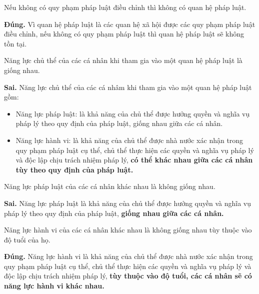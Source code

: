\begin{ques}
Nếu không có quy phạm pháp luật điều chỉnh thì không có quan hệ pháp luật.
\end{ques}
\begin{ans}
\textbf{Đúng.} Vì quan hệ pháp luật là các quan hệ xã hội được các quy phạm pháp luật điều chỉnh, nếu không có quy phạm pháp luật thì quan hệ pháp luật sẽ không tồn tại.
\end{ans}

\begin{ques}
Năng lực chủ thể của các cá nhân khi tham gia vào một quan hệ pháp luật là giống nhau.
\end{ques}
\begin{ans}
\textbf{Sai.} Năng lực chủ thể của các cá nhâm khi tham gia vào một quan hệ pháp luật gồm:
\begin{itemize}
\item Năng lực pháp luật: là khả năng của chủ thể được hưởng quyền và nghĩa vụ pháp lý theo quy định của pháp luật, giống nhau giữa các cá nhân.
\item Năng lực hành vi: là khả năng của chủ thể được nhà nước xác nhận trong quy phạm pháp luật cụ thể, chủ thể thực hiện các quyền và nghĩa vụ pháp lý và độc lập chịu trách nhiệm pháp lý, \textbf{có thể khác nhau giữa các cá nhân tùy theo quy định của pháp luật.}
\end{itemize}
\end{ans}

\begin{ques}
Năng lực pháp luật của các cá nhân khác nhau là không giống nhau.
\end{ques}
\begin{ans}
\textbf{Sai.} Năng lực pháp luật là khả năng của chủ thể được hưởng quyền và nghĩa vụ pháp lý theo quy định của pháp luật, \textbf{giống nhau giữa các cá nhân.}
\end{ans}

\begin{ques}
Năng lực hành vi của các cá nhân khác nhau là không giống nhau tùy thuộc vào độ tuổi của họ.
\end{ques}
\begin{ans}
\textbf{Đúng.} Năng lực hành vi là khả năng của chủ thể được nhà nước xác nhận trong quy phạm pháp luật cụ thể, chủ thể thực hiện các quyền và nghĩa vụ pháp lý và độc lập chịu trách nhiệm pháp lý, \textbf{tùy thuộc vào độ tuổi, các cá nhân sẽ có năng lực hành vi khác nhau.}
\end{ans}

